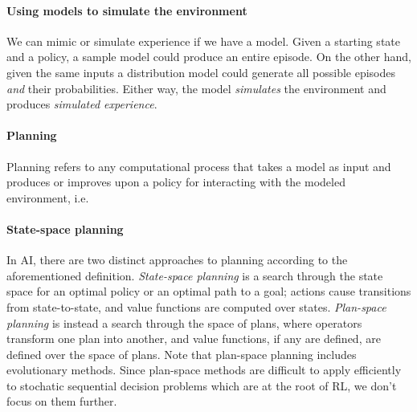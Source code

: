 \documentclass[12pt]{article}
\begin{document}
\paragraph{Using models to simulate the environment} We can mimic or simulate experience if we have a model. Given a starting state and a policy, a sample model could produce an entire episode. On the other hand, given the same inputs a distribution model could generate all possible episodes \emph{and} their probabilities. Either way, the model \emph{simulates} the environment and produces \emph{simulated experience}.

\paragraph{Planning} Planning refers to any computational process that takes a model as input and produces or improves upon a policy for interacting with the modeled environment, i.e.
\begin{figure}[h]
  \centering
\end{figure}

\paragraph{State-space planning}
In AI, there are two distinct approaches to planning according to the aforementioned definition. \emph{State-space planning} is a search through the state space for an optimal policy or an optimal path to a goal; actions cause transitions from state-to-state, and value functions are computed over states. \emph{Plan-space planning} is instead a search through the space of plans, where operators transform one plan into another, and value functions, if any are defined, are defined over the space of plans. Note that plan-space planning includes evolutionary methods. Since plan-space methods are difficult to apply efficiently to stochatic sequential decision problems which are at the root of RL, we don't focus on them further.
\end{document}

